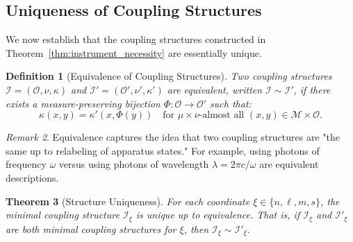 \documentclass[twocolumn,10pt,a4paper]{article}
\newtheorem{theorem}{Theorem}[section]
\newtheorem{definition}[theorem]{Definition}
\theoremstyle{remark}
\newtheorem{remark}[theorem]{Remark}
\newcommand{\manifold}{\mathcal{M}}
\newcommand{\oscillator}{\mathcal{O}}
\begin{document}
\subsection{Uniqueness of Coupling Structures}

We now establish that the coupling structures constructed in Theorem~\ref{thm:instrument_necessity} are essentially unique.

\begin{definition}[Equivalence of Coupling Structures]
\label{def:coupling_equivalence}
Two coupling structures $\mathcal{I} = (\oscillator, \nu, \kappa)$ and $\mathcal{I}' = (\oscillator', \nu', \kappa')$ are \emph{equivalent}, written $\mathcal{I} \sim \mathcal{I}'$, if there exists a measure-preserving bijection $\Phi: \oscillator \to \oscillator'$ such that:
\begin{equation}
\kappa(x, y) = \kappa'(x, \Phi(y)) \quad \text{for } \mu \times \nu\text{-almost all } (x, y) \in \manifold \times \oscillator.
\end{equation}
\end{definition}

\begin{remark}
Equivalence captures the idea that two coupling structures are "the same up to relabeling of apparatus states." For example, using photons of frequency $\omega$ versus using photons of wavelength $\lambda = 2\pi c / \omega$ are equivalent descriptions.
\end{remark}

\begin{theorem}[Structure Uniqueness]
\label{thm:structure_uniqueness}
For each coordinate $\xi \in \{n, \ell, m, s\}$, the minimal coupling structure $\mathcal{I}_\xi$ is unique up to equivalence. That is, if $\mathcal{I}_\xi$ and $\mathcal{I}'_\xi$ are both minimal coupling structures for $\xi$, then $\mathcal{I}_\xi \sim \mathcal{I}'_\xi$.
\end{theorem}
\end{document}
